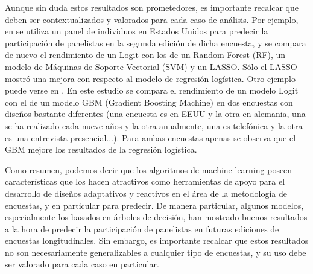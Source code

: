 Aunque sin duda estos resultados son prometedores, es importante recalcar que deben ser contextualizados y valorados para cada caso de análisis. Por ejemplo, en \cite{liu2020using} se utiliza un panel de individuos en Estados Unidos para predecir la participación de panelistas en la segunda edición de dicha encuesta, y se compara de nuevo el rendimiento de un Logit con los de un Random Forest (RF), un modelo de Máquinas de Soporte Vectorial (SVM) y un LASSO. Sólo el LASSO mostró una mejora con respecto al modelo de regresión logística. Otro ejemplo puede verse en \cite{jankowsky2022validation}. En este estudio se compara el rendimiento de un modelo Logit con el de un modelo GBM (Gradient Boosting Machine) en dos encuestas con diseños bastante diferentes (una encuesta es en EEUU y la otra en alemania, una se ha realizado cada nueve años y la otra anualmente, una es telefónica y la otra es una entrevista presencial...). Para ambas encuestas apenas se observa que el GBM mejore los resultados de la regresión logística.

Como resumen, podemos decir que los algoritmos de machine learning poseen características que los hacen atractivos como herramientas de apoyo para el desarrollo de diseños adaptativos y reactivos en el área de la metodología de encuestas, y en particular para predecir. De manera particular, algunos modelos, especialmente los basados en árboles de decisión, han mostrado buenos resultados a la hora de predecir la participación de panelistas en futuras ediciones de encuestas longitudinales. Sin embargo, es importante recalcar que estos resultados no son necesariamente generalizables a cualquier tipo de encuestas, y su uso debe ser valorado para cada caso en particular.
